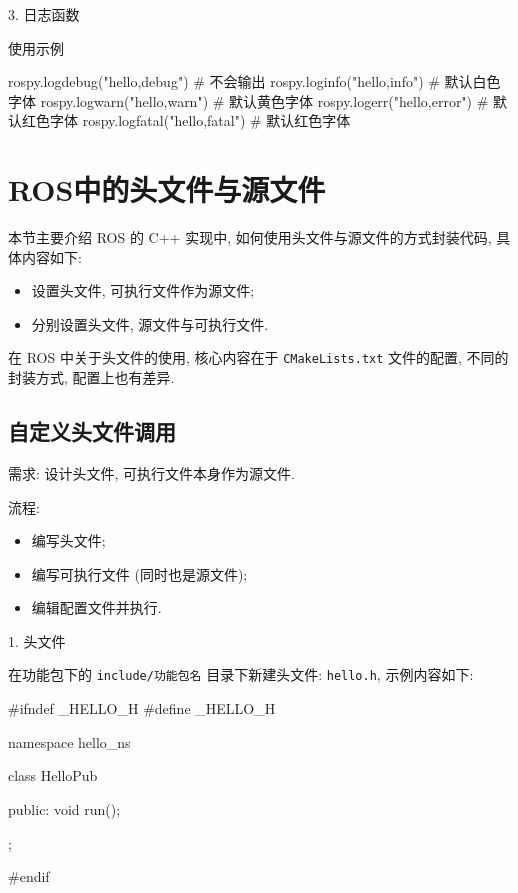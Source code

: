 \documentclass[openany, fontset=windowsold]{ctexbook}
\theoremstyle{kaiti}
\theoremstyle{normal}
\begin{document}
3. 日志函数

使用示例

\begin{python}
  rospy.logdebug("hello,debug")   # 不会输出
  rospy.loginfo("hello,info")     # 默认白色字体
  rospy.logwarn("hello,warn")     # 默认黄色字体
  rospy.logerr("hello,error")     # 默认红色字体
  rospy.logfatal("hello,fatal")   # 默认红色字体
\end{python}


\section{ROS中的头文件与源文件}

本节主要介绍 ROS 的 C++ 实现中, 如何使用头文件与源文件的方式封装代码, 具体内容如下:

\begin{itemize}
  \item 设置头文件, 可执行文件作为源文件; 
  \item 分别设置头文件, 源文件与可执行文件.
\end{itemize}

在 ROS 中关于头文件的使用, 核心内容在于 \verb|CMakeLists.txt| 文件的配置, 不同的封装方式, 配置上也有差异.

\subsection{自定义头文件调用}

需求: 设计头文件, 可执行文件本身作为源文件.

流程:

\begin{itemize}
  \item 编写头文件; 
  \item 编写可执行文件 (同时也是源文件); 
  \item 编辑配置文件并执行.
\end{itemize}

1. 头文件

在功能包下的 \verb|include/功能包名| 目录下新建头文件: \verb|hello.h|, 示例内容如下:

\begin{cpp}
  #ifndef _HELLO_H
  #define _HELLO_H

  namespace hello_ns{

  class HelloPub {

  public:
      void run();
  };

  }

  #endif
\end{cpp}
\end{document}

